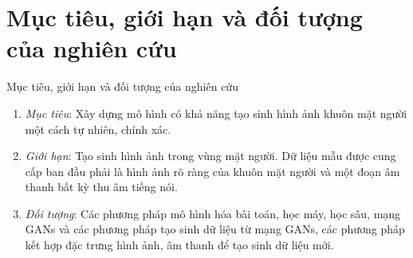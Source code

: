 \section{Mục tiêu, giới hạn và đối tượng của nghiên cứu}\label{sec:intro}
\frame{\tableofcontents[currentsection]}
\begin{frame}{Mục tiêu, giới hạn và đối tượng của nghiên cứu}
\begin{enumerate}
    \item \textit{Mục tiêu}: Xây dựng mô hình có khả năng tạo sinh hình ảnh khuôn mặt người một cách tự nhiên, chính xác.
    \item \textit{Giới hạn}: Tạo sinh hình ảnh trong vùng mặt người. Dữ liệu mẫu được cung cấp ban đầu phải là hình ảnh rõ ràng của khuôn mặt người và một đoạn âm thanh bất kỳ thu âm tiếng nói.
    \item \textit{Đối tượng}: Các phương pháp mô hình hóa bài toán, học máy, học sâu, mạng GANs và các phương pháp tạo sinh dữ liệu từ mạng GANs, các phương pháp kết hợp đặc trưng hình ảnh, âm thanh để tạo sinh dữ liệu mới.
\end{enumerate}
\end{frame}
